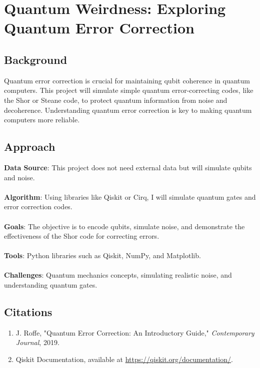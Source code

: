 \documentclass{article}
\begin{document}
\newpage

\section{Quantum Weirdness: Exploring Quantum Error Correction}

\subsection{Background} Quantum error correction is crucial for maintaining qubit coherence in quantum computers. This project will simulate simple quantum error-correcting codes, like the Shor or Steane code, to protect quantum information from noise and decoherence. Understanding quantum error correction is key to making quantum computers more reliable.

\subsection{Approach}

\textbf{Data Source}: This project does not need external data but will simulate qubits and noise.\\\\
\textbf{Algorithm}: Using libraries like Qiskit or Cirq, I will simulate quantum gates and error correction codes.\\\\
\textbf{Goals}: The objective is to encode qubits, simulate noise, and demonstrate the effectiveness of the Shor code for correcting errors.\\\\
\textbf{Tools}: Python libraries such as Qiskit, NumPy, and Matplotlib.\\\\
\textbf{Challenges}: Quantum mechanics concepts, simulating realistic noise, and understanding quantum gates.

\subsection{Citations} 
    \begin{enumerate} 
        \item J. Roffe, "Quantum Error Correction: An Introductory Guide," \textit{Contemporary Journal}, 2019.
        \item Qiskit Documentation, available at \url{https://qiskit.org/documentation/}.
    \end{enumerate}
\end{document}
